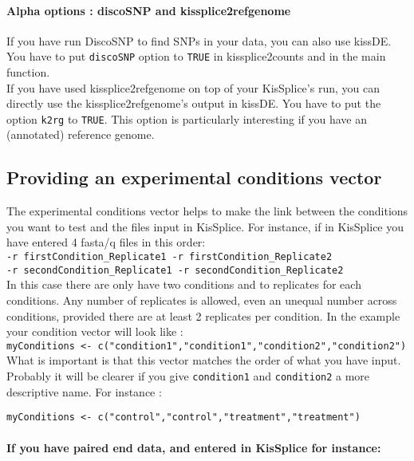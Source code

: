 \documentclass[english, a4paper, 12pt]{article}
\begin{document}
\paragraph{Alpha options : discoSNP and kissplice2refgenome\\}
If you have run DiscoSNP to find SNPs in your data, you can also use kissDE. You have to put \texttt{discoSNP} option to \texttt{TRUE} in kissplice2counts and in the main function.\\
If you have used kissplice2refgenome on top of your KisSplice's run, you can directly use the kissplice2refgenome's output in kissDE. You have to put the option \texttt{k2rg} to \texttt{TRUE}. This option is particularly interesting if you have an (annotated) reference genome.


\subsection{Providing an experimental conditions vector}
The experimental conditions vector helps to make the link between the conditions you want to test and the files input in KisSplice. For instance, if in KisSplice you have entered 4 fasta/q files in this order:\\

\texttt{-r firstCondition\_Replicate1 -r firstCondition\_Replicate2\\
-r secondCondition\_Replicate1 -r secondCondition\_Replicate2}\\

In this case there are only have two conditions and to replicates for each conditions. Any number of replicates is allowed, even an unequal number across conditions, provided there are at least 2 replicates per condition. In the example your condition vector will look like :\\

\texttt{myConditions <- c("condition1","condition1","condition2","condition2")}\\

What is important is that this vector matches the order of what you have input. Probably it will be clearer if you give \texttt{condition1} and \texttt{condition2} a more descriptive name. For instance :

\texttt{myConditions <- c("control","control","treatment","treatment")}\\
 

\paragraph{If you have paired end data, and entered in KisSplice for instance:\\}
\end{document}
